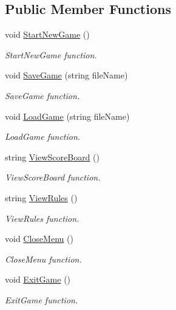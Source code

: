 \subsection*{Public Member Functions}
\begin{DoxyCompactItemize}
\item 
void \mbox{\hyperlink{interface_game_1_1_i_menu_logic_a1336eac89b3be808d5fc174b3a972f70}{Start\+New\+Game}} ()
\begin{DoxyCompactList}\small\item\em Start\+New\+Game function. \end{DoxyCompactList}\item 
void \mbox{\hyperlink{interface_game_1_1_i_menu_logic_a68b0eadeb8c218443f9261526b1d9d7b}{Save\+Game}} (string file\+Name)
\begin{DoxyCompactList}\small\item\em Save\+Game function. \end{DoxyCompactList}\item 
void \mbox{\hyperlink{interface_game_1_1_i_menu_logic_a6a8e5c2d0407676f4f39d3fd81124aef}{Load\+Game}} (string file\+Name)
\begin{DoxyCompactList}\small\item\em Load\+Game function. \end{DoxyCompactList}\item 
string \mbox{\hyperlink{interface_game_1_1_i_menu_logic_a4abce1542884de119ff7f241979106ee}{View\+Score\+Board}} ()
\begin{DoxyCompactList}\small\item\em View\+Score\+Board function. \end{DoxyCompactList}\item 
string \mbox{\hyperlink{interface_game_1_1_i_menu_logic_a4d6129e2d747d4d6047e9d26d8996ac2}{View\+Rules}} ()
\begin{DoxyCompactList}\small\item\em View\+Rules function. \end{DoxyCompactList}\item 
void \mbox{\hyperlink{interface_game_1_1_i_menu_logic_aab0f7fd346ea32f819ec12aee99d3656}{Close\+Menu}} ()
\begin{DoxyCompactList}\small\item\em Close\+Menu function. \end{DoxyCompactList}\item 
void \mbox{\hyperlink{interface_game_1_1_i_menu_logic_a5db6fe816331b646a2f7a2ac889fff26}{Exit\+Game}} ()
\begin{DoxyCompactList}\small\item\em Exit\+Game function. \end{DoxyCompactList}\end{DoxyCompactItemize}


